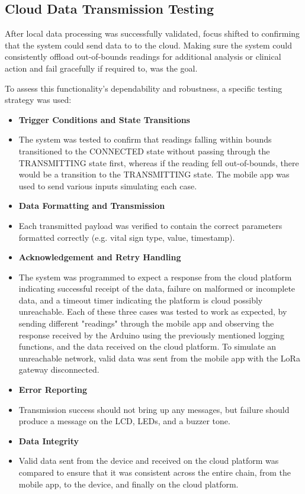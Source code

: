 \subsection{Cloud Data Transmission Testing}
After local data processing was successfully validated, focus shifted to confirming that the system could send data to to the cloud. Making sure the system could consistently offload out-of-bounds readings for additional analysis or clinical action and fail gracefully if required to, was the goal.

To assess this functionality's dependability and robustness, a specific testing strategy was used:

\begin{itemize}
	\item \textbf{Trigger Conditions and State Transitions}
	\item[] The system was tested to confirm that readings falling within bounds transitioned to the CONNECTED state without passing through the TRANSMITTING state first, whereas if the reading fell out-of-bounds, there would be a transition to the TRANSMITTING state. The mobile app was used to send various inputs simulating each case.
	\item \textbf{Data Formatting and Transmission}
	\item[] Each transmitted payload was verified to contain the correct parameters formatted correctly (e.g. vital sign type, value, timestamp).
	\item \textbf{Acknowledgement and Retry Handling}
	\item[] The system was programmed to expect a response from the cloud platform indicating successful receipt of the data, failure on malformed or incomplete data, and a timeout timer indicating the platform is cloud possibly unreachable. Each of these three cases was tested to work as expected, by sending different "readings" through the mobile app and observing the response received by the Arduino using the previously mentioned logging functions, and the data received on the cloud platform. To simulate an unreachable network, valid data was sent from the mobile app with the LoRa gateway disconnected.
	\item \textbf{Error Reporting}
	\item[] Transmission success should not bring up any messages, but failure should produce a message on the LCD, LEDs, and a buzzer tone.
	\item \textbf{Data Integrity}
	\item[] Valid data sent from the device and received on the cloud platform was compared to ensure that it was consistent across the entire chain, from the mobile app, to the device, and finally on the cloud platform.
\end{itemize}

